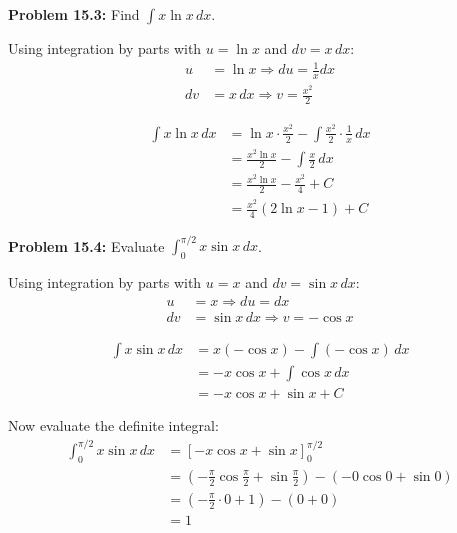 \documentclass[12pt,a4paper]{book}
\theoremstyle{definition}
\begin{document}
\begin{solution}
\textbf{Problem 15.3:} Find $\int x \ln x \, dx$.

Using integration by parts with $u = \ln x$ and $dv = x \, dx$:
\begin{align}
u &= \ln x \Rightarrow du = \frac{1}{x} dx\\
dv &= x \, dx \Rightarrow v = \frac{x^2}{2}
\end{align}

\begin{align}
\int x \ln x \, dx &= \ln x \cdot \frac{x^2}{2} - \int \frac{x^2}{2} \cdot \frac{1}{x} \, dx\\
&= \frac{x^2 \ln x}{2} - \int \frac{x}{2} \, dx\\
&= \frac{x^2 \ln x}{2} - \frac{x^2}{4} + C\\
&= \frac{x^2}{4}(2\ln x - 1) + C
\end{align}
\end{solution}

\begin{solution}
\textbf{Problem 15.4:} Evaluate $\int_0^{\pi/2} x \sin x \, dx$.

Using integration by parts with $u = x$ and $dv = \sin x \, dx$:
\begin{align}
u &= x \Rightarrow du = dx\\
dv &= \sin x \, dx \Rightarrow v = -\cos x
\end{align}

\begin{align}
\int x \sin x \, dx &= x(-\cos x) - \int (-\cos x) \, dx\\
&= -x\cos x + \int \cos x \, dx\\
&= -x\cos x + \sin x + C
\end{align}

Now evaluate the definite integral:
\begin{align}
\int_0^{\pi/2} x \sin x \, dx &= [-x\cos x + \sin x]_0^{\pi/2}\\
&= \left(-\frac{\pi}{2}\cos\frac{\pi}{2} + \sin\frac{\pi}{2}\right) - (-0\cos 0 + \sin 0)\\
&= \left(-\frac{\pi}{2} \cdot 0 + 1\right) - (0 + 0)\\
&= 1
\end{align}
\end{solution}
\end{document}

